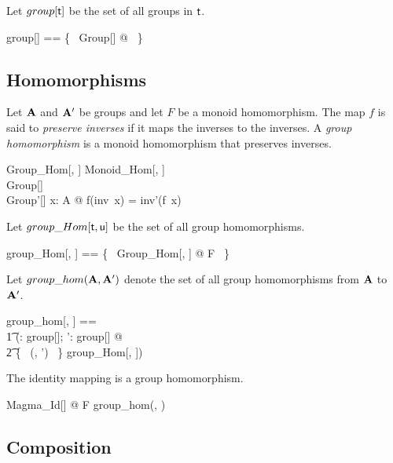 \documentclass{amsart}
\begin{document}
Let $group[\mathsf{t}]$ be the set of all groups in $\mathsf{t}$.
\begin{zed}
	group[\genT] == \{~ Group[\genT] @ \strucA ~\}
\end{zed}

\subsection{Homomorphisms}

Let $\mathbf{A}$ and $\mathbf{A}'$ be groups and let $F$ be a monoid homomorphism. 
The map $f$ is said to \textit{preserve inverses} if it maps the inverses to the inverses.
A \textit{group homomorphism} is a monoid homomorphism that preserves inverses.

\begin{schema}{Group\_Hom}[\genT, \genU]
	Monoid\_Hom[\genT, \genU] \\
	Group[\genT] \\
	Group'[\genU]
\where
	\forall x: A @ f(inv~x) = inv'(f~x)
\end{schema}

Let $group\_Hom[\mathsf{t}, \mathsf{u}]$ be the set of all group homomorphisms.

\begin{zed}
	group\_Hom[\genT, \genU] == \{~ Group\_Hom[\genT, \genU] @ F ~\}
\end{zed}

Let $group\_hom(\mathbf{A}, \mathbf{A}')$ denote the set of all group homomorphisms from $\mathbf{A}$ to $\mathbf{A}'$.

\begin{zed}
	group\_hom[\genT, \genU] == \\
	\t1	(\lambda \strucA: group[\genT]; \strucA': group[\genU] @ \\
	\t2		\{~ (\strucA, \strucA') ~\} \dres group\_Hom[\genT, \genU])
\end{zed}

\begin{example}[Identity]

The identity mapping is a group homomorphism.

\begin{zed}
	\forall Magma\_Id[\setT] @ F \in group\_hom(\strucA, \strucA)
\end{zed}

\end{example}

\subsection{Composition}
\end{document}
